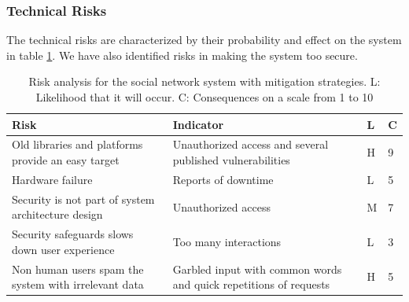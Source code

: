 \documentclass[a4paper]{article}
\begin{document}
\subsubsection{Technical Risks}
The technical risks are characterized by their probability and effect on the system in table \ref{tab:risk_analysis}. We have also identified risks in making the system too secure.

\begin{table}[h!]
	\begin{tabular}{| p{5cm} | p{5cm} | l | l |}
		\hline
		\textbf{Risk} & \textbf{Indicator} & \textbf{L} & \textbf{C}  \\ \hline
        Old libraries and platforms provide an easy target & Unauthorized access and several published vulnerabilities & H & 9 \\\hline
        Hardware failure & Reports of downtime & L & 5 \\ \hline
        Security is not part of system architecture design & Unauthorized access & M & 7 \\ \hline
		Security safeguards slows down user experience & Too many interactions & L & 3
		\\ \hline
		Non human users spam the system with irrelevant data & Garbled input with common words and quick repetitions of requests & H & 5
				\\ \hline
	\end{tabular}
	\caption{Risk analysis for the social network system with mitigation strategies. L: Likelihood that it will occur. C: Consequences on a scale from 1 to 10}
	\label{tab:risk_analysis}
	

\end{table}
\end{document}
